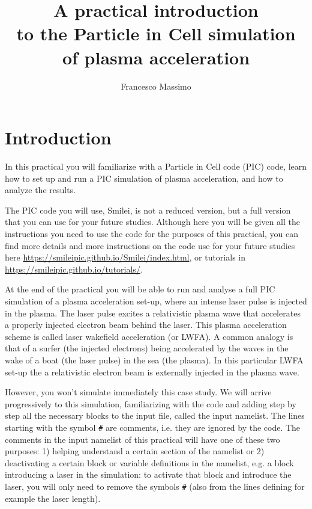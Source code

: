 \documentclass{article}
\title{\vspace{-2.cm}A practical introduction \\to the Particle in Cell simulation \\of plasma acceleration}
\author{Francesco Massimo
}
\newcommand{\smilei}{{\sc Smilei}\xspace}
\begin{document}
\maketitle

\tableofcontents

\section{Introduction} %
In this practical you will familiarize with a Particle in Cell code (PIC) code, learn how to set up and run a PIC simulation of plasma acceleration, and how to analyze the results.

The PIC code you will use, \smilei, is not a reduced version, but a full version that you can use for your future studies. Although here you will be given all the instructions you need to use the code for the purposes of this practical, you can find more details and more instructions on the code use for your future studies here \url{https://smileipic.github.io/Smilei/index.html}, or tutorials in \url{https://smileipic.github.io/tutorials/}.

At the end of the practical you will be able to run and analyse a full PIC simulation of a plasma acceleration set-up, where an intense laser pulse is injected in the plasma. The laser pulse excites a relativistic plasma wave that accelerates a properly injected electron beam behind the laser.  This plasma acceleration scheme is called laser wakefield acceleration (or LWFA).  A common analogy is that of a surfer (the injected electrons) being accelerated by the waves in the wake of a boat (the laser pulse) in the sea (the plasma).  In this particular LWFA set-up the a relativistic electron beam is externally injected in the plasma wave.

However, you won't simulate immediately this case study. We will arrive progressively to this simulation, familiarizing with the code and adding step by step all the necessary blocks to the input file, called the input namelist. The lines starting with the symbol \texttt{\#} are comments, i.e. they are ignored by the code. The comments in the input namelist of this practical will have one of these two purposes: 1) helping understand a certain section of the namelist or 2) deactivating a certain block or variable definitions in the namelist, e.g. a block introducing a laser in the simulation: to activate that block and introduce the laser, you will only need to remove the symbols \texttt{\#} (also from the lines defining for example the laser length).
\end{document}
